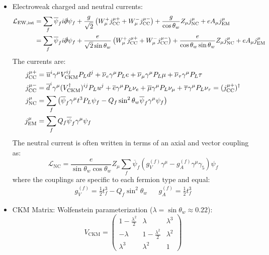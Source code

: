 \documentclass[11pt, oneside]{article}   	%
\theoremstyle{definition}
\numberwithin{equation}{subsection}		%
\begin{document}
\begin{itemize}
	\item Electroweak charged and neutral currents:
	\begin{align}
		\mathcal L_\mathrm{EW, int} &= \sum_f \overline\psi_f i\slashed\partial\psi_f + \frac{g}{\sqrt 2} \left( W_\mu^+ j_\mathrm{CC}^{\mu 
		+} + W_\mu^- j_\mathrm{CC}^{\mu -} \right) + \frac{g}{\cos\theta_w} Z_\mu j_\mathrm{NC}^\mu + e A_\mu j_\mathrm{EM}^\mu \\
		&= \sum_f \overline\psi_f i\slashed\partial\psi_f + \frac{e}{\sqrt 2\sin\theta_w} \left( W_\mu^+ j_\mathrm{CC}^{\mu 
		+} + W_\mu^- j_\mathrm{CC}^{\mu -} \right) + \frac{e}{\cos\theta_w\sin\theta_w} Z_\mu j_\mathrm{NC}^\mu + e A_\mu 
		j_\mathrm{EM}^\mu
	\end{align}
	The currents are:
	\begin{align}
	j_{\textnormal{CC}}^{\mu +} &= \overline u^i \gamma^\mu V^{ij}_\mathrm{CKM} P_L d^j +  \overline\nu_e \gamma^\mu P_L e + \overline\nu_\mu \gamma^\mu P_L \mu + \overline\nu_\tau \gamma^\mu P_L \tau \\
	j_{\textnormal{CC}}^{\mu -} &= \overline d^i \gamma^\mu (V_\mathrm{CKM}^\dagger)^{ij} P_L u^j + \overline e \gamma^\mu 
	P_L\nu_e + \overline \mu \gamma^\mu P_L \nu_\mu + \overline\tau \gamma^\mu P_L\nu_\tau = (j_\mathrm{CC}^{\mu +})^\dagger  
	\\
		j_\mathrm{NC}^\mu &= \sum_f \left( \overline\psi_f \gamma^\mu t^3 P_L\psi_f - Q_f\sin^2\theta_w \overline\psi_f\gamma^\mu\psi_f \right) \\
		j_\mathrm{EM}^\mu &= \sum_f Q_f \overline \psi_f \gamma^\mu\psi_f
	\end{align}
	The neutral current is often written in terms of an axial and vector coupling as:
	\begin{equation}
		\mathcal L_\mathrm{NC} = \frac{e}{\sin\theta_w \cos\theta_w} Z_\mu \sum_f \overline\psi_f \left(g_V^{(f)}\gamma^\mu - 
		g_A^{(f)}\gamma^\mu\gamma_5\right) \psi_f
	\end{equation}
	where the couplings are specific to each fermion type and equal:
	\begin{align}
		g_V^{(f)} = \frac{1}{2} t^3_f - Q_f\sin^2\theta_w && g_A^{(f)} = \frac{1}{2} t^3_f
	\end{align}
	
	\item CKM Matrix: Wolfenstein parameterization ($\lambda = \sin\theta_w\approx 0.22$):
	\begin{equation}
	V_\mathrm{CKM} = \begin{pmatrix} 1 - \frac{\lambda^2}{2} & \lambda & \lambda^3 \\
	-\lambda & 1 - \frac{\lambda^2}{2} & \lambda^2 \\
	\lambda^3 & \lambda^2 & 1
	\end{pmatrix}
	\end{equation}
	

\end{itemize}
\end{document}
